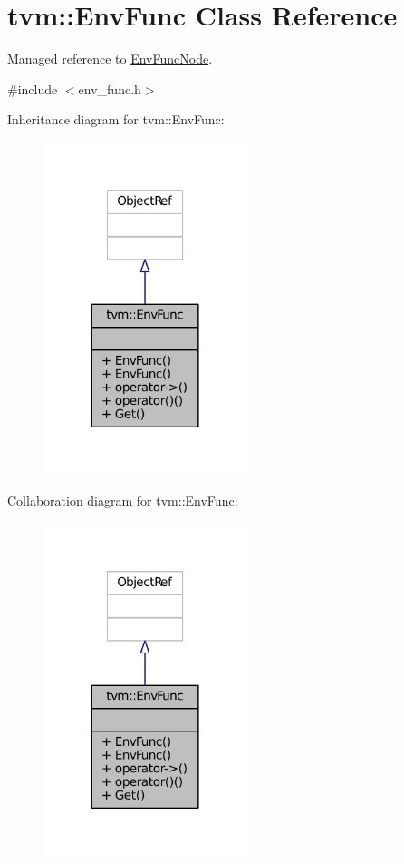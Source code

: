 \hypertarget{classtvm_1_1EnvFunc}{}\section{tvm\+:\+:Env\+Func Class Reference}
\label{classtvm_1_1EnvFunc}


Managed reference to \hyperlink{classtvm_1_1EnvFuncNode}{Env\+Func\+Node}.  




{\ttfamily \#include $<$env\+\_\+func.\+h$>$}



Inheritance diagram for tvm\+:\+:Env\+Func\+:
\nopagebreak
\begin{figure}[H]
\begin{center}
\leavevmode
\includegraphics[width=168pt]{classtvm_1_1EnvFunc__inherit__graph}
\end{center}
\end{figure}


Collaboration diagram for tvm\+:\+:Env\+Func\+:
\nopagebreak
\begin{figure}[H]
\begin{center}
\leavevmode
\includegraphics[width=168pt]{classtvm_1_1EnvFunc__coll__graph}
\end{center}
\end{figure}

